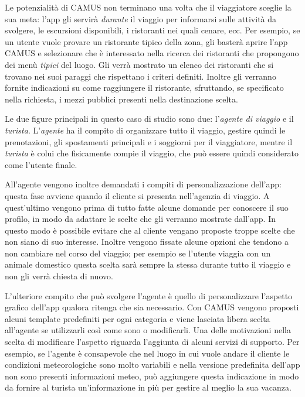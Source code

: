Le potenzialità di CAMUS non terminano una volta che il viaggiatore sceglie la sua meta: l'app gli servirà \emph{durante} il viaggio per informarsi sulle attività da svolgere, le escursioni disponibili, i ristoranti nei quali cenare, ecc. Per esempio, se un utente vuole provare un ristorante tipico della zona, gli basterà aprire l'app CAMUS e selezionare che è interessato nella ricerca dei ristoranti che propongono dei menù \emph{tipici} del luogo. Gli verrà mostrato un elenco dei ristoranti che si trovano nei suoi paraggi che rispettano i criteri definiti. Inoltre gli verranno fornite indicazioni su come raggiungere il ristorante, sfruttando, se specificato nella richiesta, i mezzi pubblici presenti nella destinazione scelta.

Le due figure principali in questo caso di studio sono due: l'\emph{agente di viaggio} e il \emph{turista}. L'\emph{agente} ha il compito di organizzare tutto il viaggio, gestire quindi le prenotazioni, gli spostamenti principali e i soggiorni per il viaggiatore, mentre il \emph{turista} è colui che fisicamente compie il viaggio, che può essere quindi considerato come l'utente finale.

All'agente vengono inoltre demandati i compiti di personalizzazione dell'app: questa fase avviene quando il cliente si presenta nell'agenzia di viaggio. A quest'ultimo vengono prima di tutto fatte alcune domande per conoscere il suo profilo, in modo da adattare le scelte che gli verranno mostrate dall'app. In questo modo è possibile evitare che al cliente vengano proposte troppe scelte che non siano di suo interesse. Inoltre vengono fissate alcune opzioni che tendono a non cambiare nel corso del viaggio; per esempio se l'utente viaggia con un animale domestico questa scelta sarà sempre la stessa durante tutto il viaggio e non gli verrà chiesta di nuovo.%

L'ulteriore compito che può svolgere l'agente è quello di personalizzare l'aspetto grafico dell'app qualora ritenga che sia necessario. Con CAMUS vengono proposti alcuni template predefiniti per ogni categoria e viene lasciata libera scelta all'agente se utilizzarli così come sono o modificarli. Una delle motivazioni nella scelta di modificare l'aspetto riguarda l'aggiunta di alcuni servizi di supporto. Per esempio, se l'agente è consapevole che nel luogo in cui vuole andare il cliente le condizioni meteorologiche sono molto variabili e nella versione predefinita dell'app non sono presenti informazioni meteo, può aggiungere questa indicazione in modo da fornire al turista un'informazione in più per gestire al meglio la sua vacanza.

